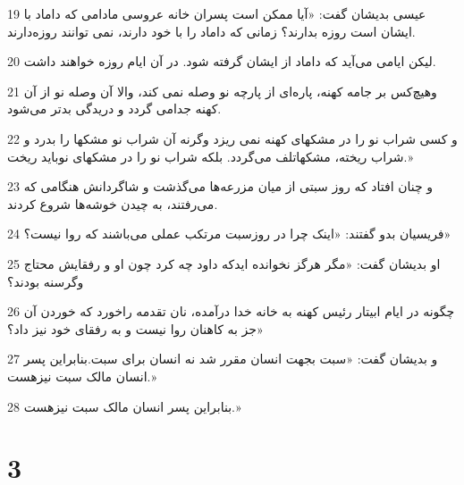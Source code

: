 \par 19 عیسی بدیشان گفت: «آیا ممکن است پسران خانه عروسی مادامی که داماد با ایشان است روزه بدارند؟ زمانی که داماد را با خود دارند، نمی توانند روزه‌دارند.
\par 20 لیکن ایامی می‌آید که داماد از ایشان گرفته شود. در آن ایام روزه خواهند داشت.
\par 21 وهیچ‌کس بر جامه کهنه، پاره‌ای از پارچه نو وصله نمی کند، والا آن وصله نو از آن کهنه جدامی گردد و دریدگی بدتر می‌شود.
\par 22 و کسی شراب نو را در مشکهای کهنه نمی ریزد وگرنه آن شراب نو مشکها را بدرد و شراب ریخته، مشکهاتلف می‌گردد. بلکه شراب نو را در مشکهای نوباید ریخت.»
\par 23 و چنان افتاد که روز سبتی از میان مزرعه‌ها می‌گذشت و شاگردانش هنگامی که می‌رفتند، به چیدن خوشه‌ها شروع کردند.
\par 24 فریسیان بدو گفتند: «اینک چرا در روزسبت مرتکب عملی می‌باشند که روا نیست؟»
\par 25 او بدیشان گفت: «مگر هرگز نخوانده ایدکه داود چه کرد چون او و رفقایش محتاج وگرسنه بودند؟
\par 26 چگونه در ایام ابیتار رئیس کهنه به خانه خدا درآمده، نان تقدمه راخورد که خوردن آن جز به کاهنان روا نیست و به رفقای خود نیز داد؟»
\par 27 و بدیشان گفت: «سبت بجهت انسان مقرر شد نه انسان برای سبت.بنابراین پسر انسان مالک سبت نیزهست.»
\par 28 بنابراین پسر انسان مالک سبت نیزهست.»

\chapter{3}

